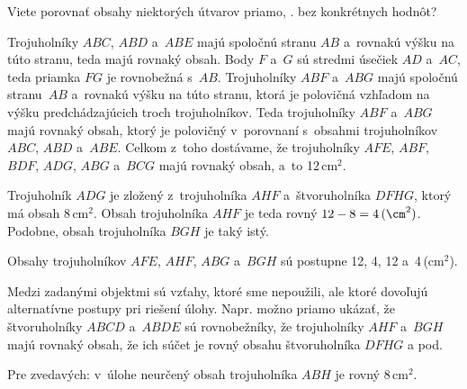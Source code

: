 {%
\napad
Viete porovnať obsahy niektorých útvarov priamo, \tj. bez konkrétnych hodnôt?

\riesenie
Trojuholníky $ABC$, $ABD$ a~$ABE$ majú spoločnú stranu $AB$ a~rovnakú výšku na túto stranu, teda majú rovnaký obsah.
Body $F$ a~$G$ sú stredmi úsečiek $AD$ a~$AC$, teda priamka $FG$ je rovnobežná s~$AB$.
Trojuholníky $ABF$ a~$ABG$ majú spoločnú stranu~$AB$ a~rovnakú výšku na túto stranu, ktorá je polovičná vzhľadom na výšku predchádzajúcich troch trojuholníkov.
Teda trojuholníky $ABF$ a~$ABG$ majú rovnaký obsah, ktorý je polovičný v~porovnaní s~obsahmi trojuholníkov $ABC$, $ABD$ a~$ABE$.
Celkom z~toho dostávame, že trojuholníky $AFE$, $ABF$, $BDF$, $ADG$, $ABG$ a~$BCG$ majú rovnaký obsah, a~to 12\,cm$^2$.

Trojuholník $ADG$ je zložený z~trojuholníka $AHF$ a~štvoruholníka $DFHG$, ktorý má obsah 8\,cm$^2$.
Obsah trojuholníka $AHF$ je teda rovný $12-8=4\,(\cm^2)$.
Podobne, obsah trojuholníka $BGH$ je taký istý.

Obsahy trojuholníkov $AFE$, $AHF$, $ABG$ a~$BGH$ sú postupne 12, 4, 12 a~4\,(cm$^2$).

\poznamka
Medzi zadanými objektmi sú vzťahy, ktoré sme nepoužili, ale ktoré dovoľujú alternatívne postupy pri riešení úlohy.
Napr. možno priamo ukázať, že štvoruholníky $ABCD$ a~$ABDE$ sú rovnobežníky, že trojuholníky $AHF$ a~$BGH$ majú rovnaký obsah, že ich súčet je rovný
obsahu štvoruholníka $DFHG$ a pod.

Pre zvedavých: v~úlohe neurčený obsah trojuholníka $ABH$ je rovný 8\,cm$^2$.
}

